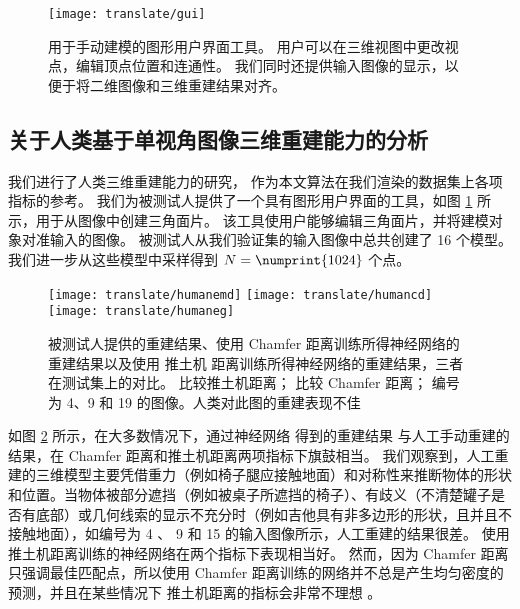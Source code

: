 \begin{figure}[h]
	\centering
	\texttt{[image: translate/gui]}
	\caption[]{用于手动建模的图形用户界面工具。 用户可以在三维视图中更改视点，编辑顶点位置和连通性。 我们同时还提供输入图像的显示，以便于将二维图像和三维重建结果对齐。}
	\label{fig:translate:gui}
\end{figure}

\subsection{关于人类基于单视角图像三维重建能力的分析}
我们进行了人类三维重建能力的研究，
作为本文算法在我们渲染的数据集上各项指标的参考。
我们为被测试人提供了一个具有图形用户界面的工具，如图 \ref{fig:translate:gui} 所示，用于从图像中创建三角面片。
该工具使用户能够编辑三角面片，并将建模对象对准输入的图像。 被测试人从我们验证集的输入图像中总共创建了 16 个模型。
我们进一步从这些模型中采样得到 $N = \numprint{1024}$ 个点。

\begin{figure}[h]
	\centering
	\subcaptionbox{\label{fig:translate:humanemd}}
	{
		\texttt{[image: translate/humanemd]}
	}
	\subcaptionbox{\label{fig:translate:humancd}}
	{
		\texttt{[image: translate/humancd]}
	}
	\subcaptionbox{\label{fig:translate:humaneg}}
	{
		\texttt{[image: translate/humaneg]}
	}
	\caption[]{被测试人提供的重建结果、使用 Chamfer 距离训练所得神经网络的重建结果以及使用 推土机 距离训练所得神经网络的重建结果，三者在测试集上的对比。
		 比较推土机距离；
		 比较 Chamfer 距离；
		 编号为 4、9 和 19 的图像。人类对此图的重建表现不佳}
	\label{fig:translate:human}
\end{figure}

如图 \ref{fig:translate:human} 所示，在大多数情况下，通过神经网络
得到的重建结果
与人工手动重建的结果，在 Chamfer 距离和推土机距离两项指标下旗鼓相当。
我们观察到，人工重建的三维模型主要凭借重力（例如椅子腿应接触地面）和对称性来推断物体的形状和位置。当物体被部分遮挡（例如被桌子所遮挡的椅子）、有歧义（不清楚罐子是否有底部）或几何线索的显示不充分时（例如吉他具有非多边形的形状，且并且不接触地面），如编号为 4 、 9 和 15 的输入图像所示，人工重建的结果很差。
使用推土机距离训练的神经网络在两个指标下表现相当好。
然而，因为 Chamfer 距离只强调最佳匹配点，所以使用 Chamfer 距离训练的网络并不总是产生均匀密度的预测，并且在某些情况下
推土机距离的指标会非常不理想
。

